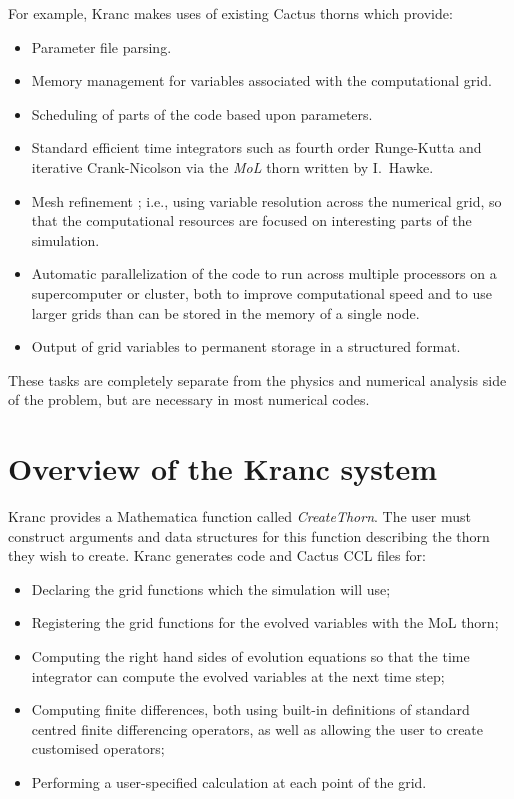 \documentclass{report}
\begin{document}
For example, Kranc makes uses of existing Cactus thorns which provide:
\begin{itemize}
\item Parameter file parsing.
\item Memory management for variables associated with the
computational grid.
\item Scheduling of parts of the code based upon parameters.
\item Standard efficient time integrators such as fourth order
Runge-Kutta and iterative Crank-Nicolson via the {\em MoL} thorn
written by I.~Hawke.
\item Mesh refinement \cite{Schnetter}; i.e., using variable resolution
across the numerical grid, so that the computational resources are
focused on interesting parts of the simulation.
\item Automatic parallelization of the code to run across multiple
processors on a supercomputer or cluster, both to improve
computational speed and to use larger grids than can be stored in the
memory of a single node.
\item Output of grid variables to permanent storage in a structured
format.
\end{itemize}
These tasks are completely separate from the physics and numerical
analysis side of the problem, but are necessary in most numerical
codes.

\section{Overview of the Kranc system}

Kranc provides a Mathematica function called {\em CreateThorn}.  The
user must construct arguments and data structures for this function
describing the thorn they wish to create.  Kranc generates code and
Cactus CCL files for:

\begin{itemize}
\item Declaring the grid functions which the simulation will use;
\item Registering the grid functions for the evolved variables with
  the MoL thorn;
\item Computing the right hand sides of evolution equations so that the
time integrator can compute the evolved variables at the next time
step;
\item Computing finite differences, both using built-in definitions of
  standard centred finite differencing operators, as well as allowing
  the user to create customised operators;
\item Performing a user-specified calculation at each point of the grid.
\end{itemize}
\end{document}
